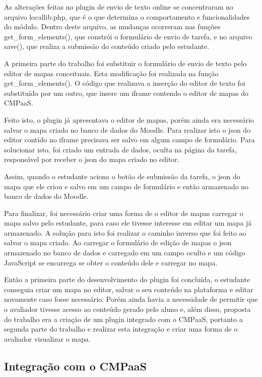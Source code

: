 \documentclass[
	12pt,				%
	openright,			%
	oneside,			%
	a4paper,			%
	english,			%
	french,				%
	spanish,			%
	brazil				%
	]{abntex2}
\begin{document}
As alterações feitas no plugin de envio de texto online se concentraram no arquivo locallib.php, que é o que determina o comportamento e funcionalidades do módulo. Dentro deste arquivo, as mudanças ocorreram nas funções get\_form\_elements(), que constrói o formulário de envio de tarefa, e no arquivo save(), que realiza a submissão do conteúdo criado pelo estudante.

A primeira parte do trabalho foi substituir o formulário de envio de texto pelo editor de mapas conceituais. Esta modificação foi realizada na função get\_form\_elements(). O código que realizava a inserção do editor de texto foi substituído por um outro, que insere um iframe contendo o editor de mapas do CMPaaS. 

Feito isto, o plugin já apresentava o editor de mapas, porém ainda era necessário salvar o mapa criado no banco de dados do Moodle. Para realizar isto o json do editor contido no iframe precisava ser salvo em algum campo de formulário. Para solucionar isto, foi criado um entrada de dados, oculta na página da tarefa, responsável por receber o json do mapa criado no editor.

Assim, quando o estudante aciona o botão de submissão da tarefa, o json do mapa que ele criou e salvo em um campo de formulário e então armazenado no banco de dados do Moodle.

Para finalizar, foi necessário criar uma forma de o editor de mapas carregar o mapa salvo pelo estudante, para caso ele tivesse interesse em editar um mapa já armazenado. A solução para isto foi realizar o caminho inverso que foi feito ao salvar o mapa criado. Ao carregar o formulário de edição de mapas o json armazenado no banco de dados e carregado em um campo oculto e um código JavaScript se encarrega se obter o conteúdo dele e carregar no mapa.

Então a primeira parte do desenvolvimento do plugin foi concluída, o estudante conseguia criar um mapa no editor, salvar o seu conteúdo na plataforma e editar novamente caso fosse necessário. Porém ainda havia a necessidade de permitir que o avaliador tivesse acesso ao conteúdo gerado pelo aluno e, além disso, proposta do trabalho era a criação de um plugin integrado com o CMPaaS,  portanto a segunda parte do trabalho e realizar esta integração e criar uma forma de o avaliador visualizar o mapa.

\subsection{Integração com o CMPaaS}
\end{document}
